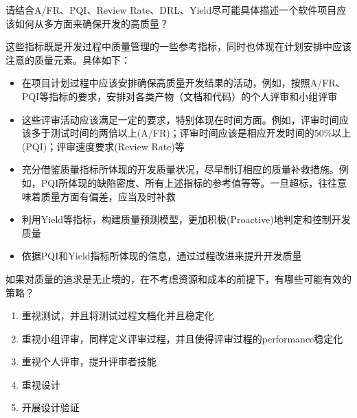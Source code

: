\begin{problem}[2015A]
请结合A/FR、PQI、Review Rate、DRL、Yield尽可能具体描述一个软件项目应该如何从多方面来确保开发的高质量？
\end{problem}

\begin{solution}
这些指标既是开发过程中质量管理的一些参考指标，同时也体现在计划安排中应该注意的质量元素。具体如下：
\begin{itemize}
    \item 在项目计划过程中应该安排确保高质量开发结果的活动，例如，按照A/FR、PQI等指标的要求，安排对各类产物（文档和代码）的个人评审和小组评审
    \item 这些评审活动应该满足一定的要求，特别体现在时间方面。例如，评审时间应该多于测试时间的两倍以上(A/FR)；评审时间应该是相应开发时间的50\%以上(PQI)；评审速度要求(Review Rate)等
    \item 充分借鉴质量指标所体现的开发质量状况，尽早制订相应的质量补救措施。例如，PQI所体现的缺陷密度、所有上述指标的参考值等等。一旦超标，往往意味着质量方面有偏差，应当及时补救
    \item 利用Yield等指标，构建质量预测模型，更加积极(Proactive)地判定和控制开发质量
    \item 依据PQI和Yield指标所体现的信息，通过过程改进来提升开发质量
\end{itemize}
\end{solution}



\begin{problem}[2013、2015A]
如果对质量的追求是无止境的，在不考虑资源和成本的前提下，有哪些可能有效的策略？
\end{problem}

\begin{solution}
\vspace{-0.8em}
\begin{multicols}{2}
    \begin{enumerate}[label=\arabic*.]
        \item 重视测试，并且将测试过程文档化并且稳定化
        \item 重视小组评审，同样定义评审过程，并且使得评审过程的performance稳定化
        \item 重视个人评审，提升评审者技能
        \item 重视设计
        \item 开展设计验证
    \end{enumerate}
\end{multicols}
\vspace{-1em}
\end{solution}



